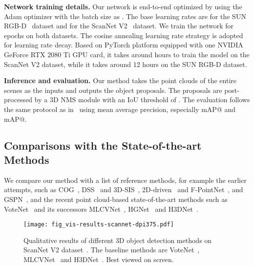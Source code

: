 \documentclass[final]{cvpr}
\begin{document}
\vspace{+1mm}
\noindent\textbf{Network training details.}
Our network is end-to-end optimized by using the Adam optimizer with the batch size as .
The base learning rates are  for the SUN RGB-D~\cite{sunrgb-d} dataset and  for the ScanNet V2~\cite{scannet} dataset. We train the network for  epochs on both datasets. 
The cosine annealing learning rate strategy\cite{loshchilov2016sgdr} is adopted for learning rate decay.
Based on PyTorch platform equipped with one NVIDIA GeForce RTX 2080 Ti GPU card, it takes around  hours to train the model on the ScanNet V2 dataset, while it takes around 12 hours on the SUN RGB-D dataset.

\vspace{+1mm}
\noindent\textbf{Inference and evaluation.}
Our method takes the point clouds of the entire scenes as the inputs and outputs the object proposals. 
The proposals are post-processed by a 3D NMS module with an IoU threshold of .
The evaluation follows the same protocol as in~\cite{dss} using mean average precision, especially mAP@ and mAP@.


\subsection{Comparisons with the State-of-the-art Methods}
\label{subsec:exp-results}

We compare our method with a list of reference methods, for example the earlier attempts, such as COG~\cite{cog}, DSS~\cite{dss} and 3D-SIS~\cite{3d-sis}, 2D-driven~\cite{2d-driven} and F-PointNet~\cite{f-pointnet}, and GSPN~\cite{gspn}, and the recent point cloud-based state-of-the-art methods such as VoteNet~\cite{votenet} and its successors MLCVNet~\cite{mlcvnet}, HGNet~\cite{hgnet} and H3DNet~\cite{h3dnet}.

\begin{figure*}
\centering
\texttt{[image: fig\_vis-results-scannet-dpi375.pdf]}
\caption{
Qualitative results of different 3D object detection methods on ScanNet V2 dataset~\cite{scannet}. 
The baseline methods are VoteNet~\cite{votenet}, MLCVNet~\cite{mlcvnet} and H3DNet~\cite{h3dnet}. 
Best viewed on screen.
}
\vspace{-5mm}
\label{fig:vis_results_scannet}
\end{figure*}
\end{document}
